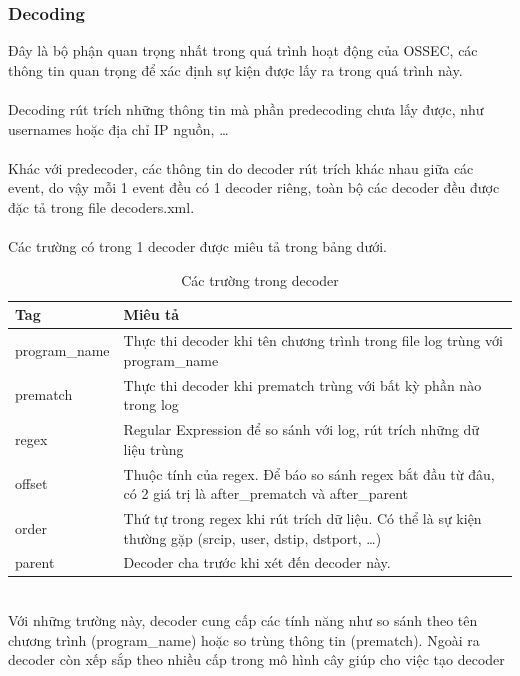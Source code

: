   		\subsubsection{Decoding}
  		Đây là bộ phận quan trọng nhất trong quá trình hoạt động của OSSEC, các
  		thông tin quan trọng để xác định sự kiện được lấy ra trong quá trình
  		này.\\\\
  		Decoding rút
  		trích những thông tin mà phần predecoding chưa lấy được, như usernames hoặc địa chỉ IP nguồn, \ldots \\\\
  		Khác với predecoder, các thông tin do decoder rút trích khác nhau giữa các
  		event, do vậy mỗi 1 event đều có 1 decoder riêng, toàn bộ các decoder đều
  		được đặc tả trong file decoders.xml.\\\\
  	 Các trường có trong 1 decoder được miêu tả trong bảng dưới.
  	 \begin{table}[h]
  	 	\centering
		\begin{tabular}{|p{3cm}|p{10cm}|}
		
  			\hline
  			\textbf{Tag} & \textbf{Miêu tả}\\
		 \hline
  			program\_name & Thực thi decoder khi tên chương trình trong file log
  			trùng với program\_name\\
  			\hline
  			prematch & Thực thi decoder khi prematch trùng với bất kỳ phần nào trong
  			log\\
  			\hline
  			regex & Regular Expression để so sánh với log, rút trích những dữ liệu   			trùng
  			\\
  			\hline 
  			offset & Thuộc tính của regex. Để báo so sánh regex bắt đầu từ đâu, có 2
  			giá trị là after\_prematch và after\_parent\\
  			\hline
  			order & Thứ tự trong regex khi rút trích dữ liệu. Có thể là sự kiện
  			thường gặp (srcip, user, dstip, dstport, \dots)\\
  			\hline
  			parent & Decoder cha trước khi xét đến decoder này.\\
  			\hline  
  		\end{tabular}
  		\caption{Các trường trong decoder}
	\end{table}\\
	Với những trường này, decoder cung cấp các tính năng như so sánh theo tên
	chương trình (program\_name) hoặc so trùng thông tin (prematch). Ngoài ra
	decoder còn xếp sắp theo nhiều cấp trong mô hình cây giúp cho việc tạo decoder
